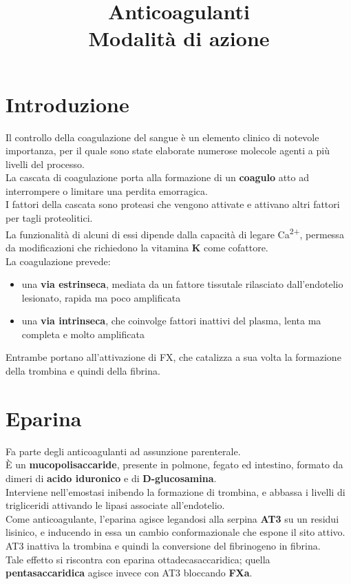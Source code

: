 \documentclass[a4paper, 12pt]{article}
\date{}
\title{%
  Anticoagulanti \\
  \large Modalità di azione
}
\begin{document}
\maketitle

\section{Introduzione}
Il controllo della coagulazione del sangue è un elemento clinico di notevole importanza, per il quale sono state elaborate numerose molecole agenti a più livelli del processo.\\
La cascata di coagulazione porta alla formazione di un \textbf{coagulo} atto ad interrompere o limitare una perdita emorragica.\\
I fattori della cascata sono proteasi che vengono attivate e attivano altri fattori per tagli proteolitici.\\
La funzionalità di alcuni di essi dipende dalla capacità di legare Ca\textsuperscript{2+}, permessa da modificazioni che richiedono la vitamina \textbf{K} come cofattore.\\
La coagulazione prevede:
\begin{itemize}
  \item una \textbf{via estrinseca}, mediata da un fattore tissutale rilasciato dall'endotelio lesionato, rapida ma poco amplificata
  \item una \textbf{via intrinseca}, che coinvolge fattori inattivi del plasma, lenta ma completa e molto amplificata
\end{itemize}
Entrambe portano all'attivazione di FX, che catalizza a sua volta la formazione della trombina e quindi della fibrina.

\section{Eparina}
Fa parte degli anticoagulanti ad assunzione parenterale.\\
È un \textbf{mucopolisaccaride}, presente in polmone, fegato ed intestino, formato da dimeri di \textbf{acido iduronico} e di \textbf{D-glucosamina}.\\
Interviene nell'emostasi inibendo la formazione di trombina, e abbassa i livelli di trigliceridi attivando le lipasi associate all'endotelio.\\
Come anticoagulante, l'eparina agisce legandosi alla serpina \textbf{AT3} su un residui lisinico, e inducendo in essa un cambio conformazionale che espone il sito attivo. AT3 inattiva la trombina e quindi la conversione del fibrinogeno in fibrina.\\
Tale effetto si riscontra con eparina ottadecasaccaridica; quella \textbf{pentasaccaridica} agisce invece con AT3 bloccando \textbf{FXa}.
\end{document}

